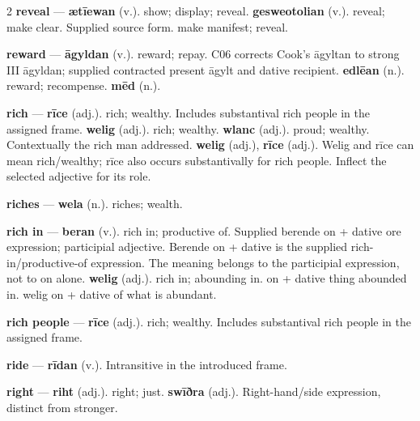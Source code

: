 \begin{multicols}{2}
\textbf{reveal} — \textbf{ætīewan} (v.). show; display; reveal. \textbf{gesweotolian} (v.). reveal; make clear. Supplied source form. make manifest; reveal.\par
\textbf{reward} — \textbf{āgyldan} (v.). reward; repay. C06 corrects Cook's āgyltan to strong III āgyldan; supplied contracted present āgylt and dative recipient. \textbf{edlēan} (n.). reward; recompense. \textbf{mēd} (n.).\par
\textbf{rich} — \textbf{rīce} (adj.). rich; wealthy. Includes substantival rich people in the assigned frame. \textbf{welig} (adj.). rich; wealthy. \textbf{wlanc} (adj.). proud; wealthy. Contextually the rich man addressed. \textbf{welig} (adj.), \textbf{rīce} (adj.). Welig and rīce can mean rich/wealthy; rīce also occurs substantivally for rich people. Inflect the selected adjective for its role.\par
\textbf{riches} — \textbf{wela} (n.). riches; wealth.\par
\textbf{rich in} — \textbf{beran} (v.). rich in; productive of. Supplied berende on + dative ore expression; participial adjective. Berende on + dative is the supplied rich-in/productive-of expression. The meaning belongs to the participial expression, not to on alone. \textbf{welig} (adj.). rich in; abounding in. on + dative thing abounded in. welig on + dative of what is abundant.\par
\textbf{rich people} — \textbf{rīce} (adj.). rich; wealthy. Includes substantival rich people in the assigned frame.\par
\textbf{ride} — \textbf{rīdan} (v.). Intransitive in the introduced frame.\par
\textbf{right} — \textbf{riht} (adj.). right; just. \textbf{swīðra} (adj.). Right-hand/side expression, distinct from stronger.\par

\end{multicols}
